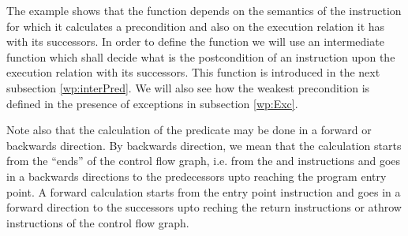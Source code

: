 The example shows that the function \fwpi{} depends  on the semantics of the instruction 
for which it calculates a precondition and also on the execution relation it has with its successors.
In order to define the function \fwpi{} we will use an intermediate function which shall decide 
what is the postcondition of an instruction  upon the execution relation with its successors. This function 
is introduced in the next subsection \ref{wp:interPred}. We will also see how the weakest precondition is defined in the presence of exceptions in subsection \ref{wp:Exc}.

Note also that the calculation of the \wpName{} predicate may be done in a forward or backwards direction. By backwards direction, we mean that the calculation starts from 
the ``ends'' of the control flow graph, i.e. from the \return{}  and \athrow{}  instructions and goes in a backwards directions to the predecessors upto reaching the program 
entry point. A forward calculation starts from the entry point instruction and goes in a forward direction to the successors upto reching the return instructions or athrow instructions 
of the control flow  graph.


